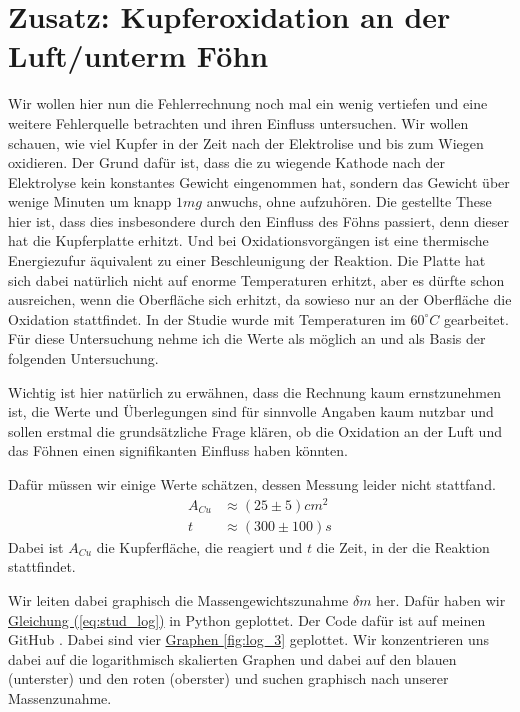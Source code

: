 \section{Zusatz: Kupferoxidation an der Luft/unterm Föhn}
Wir wollen hier nun die Fehlerrechnung noch mal ein wenig vertiefen und eine weitere Fehlerquelle betrachten und ihren Einfluss untersuchen. Wir wollen schauen, wie viel Kupfer in der Zeit nach der Elektrolise und bis zum Wiegen oxidieren.
Der Grund dafür ist, dass die zu wiegende Kathode nach der Elektrolyse kein konstantes Gewicht eingenommen hat, sondern das Gewicht über wenige Minuten um knapp $1mg$ anwuchs, ohne aufzuhören.
Die gestellte These hier ist, dass dies insbesondere durch den Einfluss des Föhns passiert, denn dieser hat die Kupferplatte erhitzt. Und bei Oxidationsvorgängen ist eine thermische Energiezufur äquivalent zu einer Beschleunigung der Reaktion.
Die Platte hat sich dabei natürlich nicht auf enorme Temperaturen erhitzt, aber es dürfte schon ausreichen, wenn die Oberfläche sich erhitzt, da sowieso nur an der Oberfläche die Oxidation stattfindet. In der Studie \cite{KupferStudie}
wurde mit Temperaturen im $60^\circ C$ gearbeitet. Für diese Untersuchung nehme ich die Werte als möglich an und als Basis der folgenden Untersuchung.

Wichtig ist hier natürlich zu erwähnen, dass die Rechnung kaum ernstzunehmen ist, die Werte und Überlegungen sind für sinnvolle Angaben kaum nutzbar und sollen erstmal die grundsätzliche Frage klären, ob die Oxidation an der Luft und das Föhnen einen signifikanten Einfluss haben könnten.

Dafür müssen wir einige Werte schätzen, dessen Messung leider nicht stattfand.
\begin{align}
    A_{Cu} &\approx (25 \pm 5)cm^2 \\
    t &\approx (300\pm100)s
\end{align}
Dabei ist $A_{Cu}$ die Kupferfläche, die reagiert und $t$ die Zeit, in der die Reaktion stattfindet.

Wir leiten dabei graphisch die Massengewichtszunahme $\delta m$ her. Dafür haben wir \hyperref[eq:stud_log]{Gleichung (\ref*{eq:stud_log})} in Python geplottet. Der Code dafür ist auf meinen GitHub \cite{githubPAP1}. 
Dabei sind vier \hyperref[fig:log_3]{Graphen \ref*{fig:log_3}} geplottet. Wir konzentrieren uns dabei auf die logarithmisch skalierten Graphen und dabei auf den blauen (unterster) und den roten (oberster) und suchen graphisch nach unserer Massenzunahme. 

